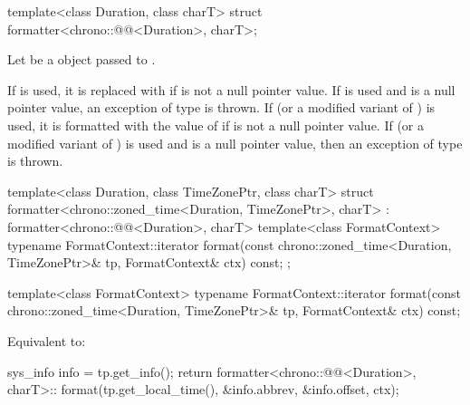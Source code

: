 %
\begin{itemdecl}
template<class Duration, class charT>
  struct formatter<chrono::@@<Duration>, charT>;
\end{itemdecl}

\begin{itemdescr}
\pnum
Let  be a  object
passed to .

\pnum
\remarks
If  is used,
it is replaced with 
if  is not a null pointer value.
If  is used
and  is a null pointer value,
an exception of type  is thrown.
If  (or a modified variant of ) is used,
it is formatted with the value of 
if  is not a null pointer value.
If  (or a modified variant of ) is used
and  is a null pointer value,
then an exception of type  is thrown.
\end{itemdescr}

%
\begin{codeblock}
template<class Duration, class TimeZonePtr, class charT>
struct formatter<chrono::zoned_time<Duration, TimeZonePtr>, charT>
    : formatter<chrono::@@<Duration>, charT> {
  template<class FormatContext>
    typename FormatContext::iterator
      format(const chrono::zoned_time<Duration, TimeZonePtr>& tp, FormatContext& ctx) const;
};
\end{codeblock}

%
\begin{itemdecl}
template<class FormatContext>
  typename FormatContext::iterator
    format(const chrono::zoned_time<Duration, TimeZonePtr>& tp, FormatContext& ctx) const;
\end{itemdecl}

\begin{itemdescr}
\pnum
\effects
Equivalent to:
\begin{codeblock}
sys_info info = tp.get_info();
return formatter<chrono::@@<Duration>, charT>::
         format({tp.get_local_time(), &info.abbrev, &info.offset}, ctx);
\end{codeblock}
\end{itemdescr}

